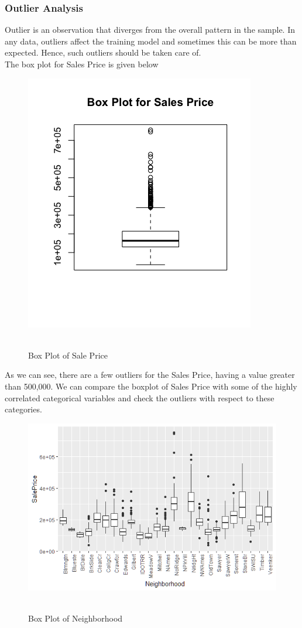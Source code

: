 \documentclass[fleqn,10pt]{SelfArx} %
\begin{document}
\subsubsection{Outlier Analysis}
Outlier is an observation that diverges from the overall pattern in the sample. In any data, outliers affect the training model and sometimes this can be more than expected. Hence, such outliers should be taken care of.
\\The box plot for Sales Price is given below
\begin{figure}[h]\centering
\includegraphics[scale=0.5]{BoxPlotSales}
\\ \caption{\\ Box Plot of Sale Price}
\end{figure}
As we can see, there are a few outliers for the Sales Price, having a value greater than 500,000.
We can compare the boxplot of Sales Price with some of the highly correlated categorical variables and check the outliers with respect to these categories.
\begin{figure}[h!]\centering
\includegraphics[scale=0.4]{Boxplot1_Neighborhood}
\\ \caption{\\ Box Plot of Neighborhood}
\end{figure}
\end{document}
